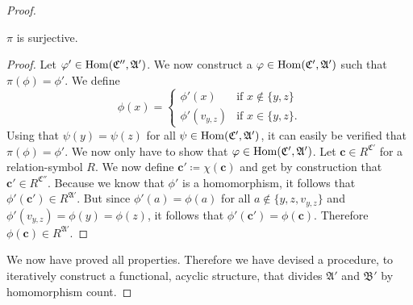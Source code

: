 \begin{proof}
	\begin{claim}
		$\pi$ is surjective.
	\end{claim}
	\begin{proof}
		Let $\varphi'\in\operatorname{Hom}(\mathfrak C'',\mathfrak A')$.
		We now construct a $\varphi\in\operatorname{Hom}(\mathfrak C',\mathfrak A')$ such that $\pi(\phi)=\phi'$.
		We define
		$$
		\phi(x)=
		\begin{cases}
			\phi'(x) & \text{if } x \notin \{y,z\} \\
			\phi'(v_{y,z}) & \text{if } x \in \{y,z\}.
		\end{cases}
		$$
		Using that $\psi(y)=\psi(z)$ for all $\psi\in\operatorname{Hom}(\mathfrak C',\mathfrak A')$, it can easily be verified that $\pi(\phi)=\phi'$.
		We now only have to show that $\varphi\in\operatorname{Hom}(\mathfrak C',\mathfrak A')$. 
		Let $\mathbf c\in R^{\mathfrak C'}$ for a relation-symbol $R$.
		We now define $\mathbf c'\coloneqq \chi(\mathbf c)$ and get by construction that $\mathbf c'\in R^{\mathfrak C''}$.
		Because we know that $\phi'$ is a homomorphism, it follows that $\phi'(\mathbf c')\in R^{\mathfrak A'}$.
		But since $\phi'(a)=\phi(a)$ for all $a\notin \{y,z,v_{y,z}\}$ and $\phi'(v_{y,z})=\phi(y)=\phi(z)$, it follows that $\phi'(\mathbf c')=\phi(\mathbf c)$.
		Therefore $\phi(\mathbf c)\in R^{\mathfrak A'}$.
	\end{proof}
	
	We now have proved all properties.
	Therefore we have devised a procedure, to iteratively construct a functional, acyclic structure, that divides $\mathfrak A'$ and $\mathfrak B'$ by homomorphism count.
\end{proof}